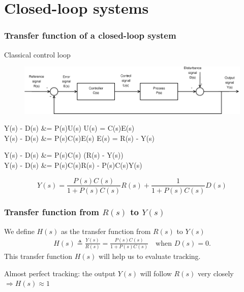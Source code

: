 \section{Closed-loop systems}
\begin{frame}
	\frametitle{Transfer function of a closed-loop system}
	\begin{block}{Classical control loop}
		\begin{figure}
			\centering
			\includegraphics[width=1\linewidth]{Closed-Loop}
			\label{fig:Closed-Loop2}
		\end{figure}
		\vspace{0.2em}
	\end{block}
	\begin{block}{}
		\begin{flalign*}
			Y(s) - D(s) &= P(s)U(s) \quad {} U(s) = C(s)E(s) \\
			Y(s) - D(s) &= P(s)C(s)E(s) \quad {} E(s) = R(s) - Y(s) \\
		\end{flalign*}
	\end{block}
\end{frame}
\begin{frame}
	\begin{block}{}
		\begin{flalign*}
			Y(s) - D(s) &= P(s)C(s) (R(s) - Y(s)) \\
			Y(s) - D(s) &= P(s)C(s)R(s) - P(s)C(s)Y(s) \\
		\end{flalign*}
	\end{block}
	\begin{alertblock}{}
		\[
			Y(s) = \frac{P(s)C(s)}{1 + P(s)C(s)}R(s) + \frac{1}{1 + P(s)C(s)}D(s)
		\]
	\end{alertblock}
\end{frame}


\begin{frame}
	\frametitle{Transfer function from $R(s)$ to $Y(s)$}
	\begin{definition}
		We define $H(s)$ as the transfer function from $R(s)$ to $Y(s)$
		\begin{align*}
		H(s) \triangleq \frac{Y(s)}{R(s)} = \frac{P(s)C(s)}{1 + P(s) C(s)} \quad \text{when } D(s) = 0.
		\end{align*}
		This transfer function $H(s)$ will help us to evaluate tracking.
		
		Almost perfect tracking: the output $Y(s)$ will follow $R(s)$ very closely $\Rightarrow H(s) \approx 1$
	\end{definition}
	
\end{frame}


